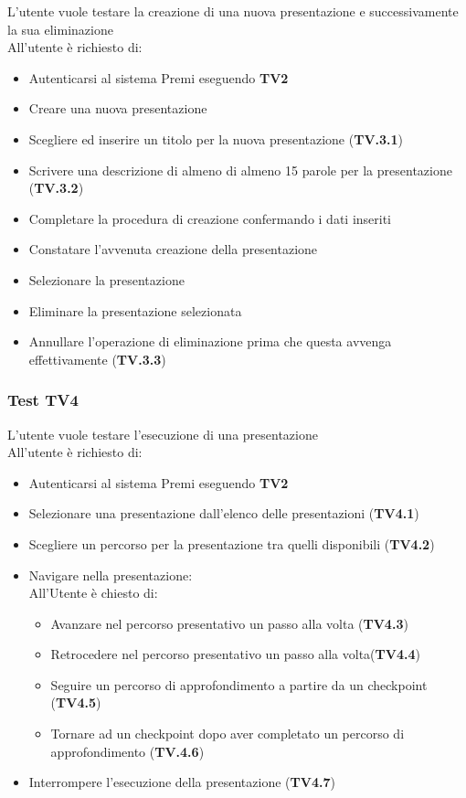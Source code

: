 L'utente vuole testare la creazione di una nuova presentazione e successivamente la sua eliminazione\\
All'utente è richiesto di:
\begin{itemize}
	\item Autenticarsi al sistema Premi eseguendo \textbf{TV2}
	\item Creare una nuova presentazione 
	\item Scegliere ed inserire un titolo per la nuova presentazione (\textbf{TV.3.1}) 
	\item Scrivere una descrizione di almeno di almeno 15 parole per la presentazione (\textbf{TV.3.2})  
	\item Completare la procedura di creazione confermando i dati inseriti
	\item Constatare l'avvenuta creazione della presentazione
	\item Selezionare la presentazione
	\item Eliminare la presentazione selezionata 
	\item Annullare l'operazione di eliminazione prima che questa avvenga effettivamente (\textbf{TV.3.3})
\end{itemize}

\subsubsection {Test TV4} %

L'utente vuole testare l'esecuzione di una presentazione\\
All'utente è richiesto di:

\begin{itemize}
	\item Autenticarsi al sistema Premi eseguendo \textbf{TV2}
	\item Selezionare una presentazione dall'elenco delle presentazioni (\textbf{TV4.1}) 
	\item Scegliere un percorso per la presentazione tra quelli disponibili (\textbf{TV4.2})
	\item Navigare nella presentazione:\\
	All'Utente è chiesto di:
	\begin{itemize}
		\item Avanzare nel percorso presentativo un passo alla volta (\textbf{TV4.3})
		\item Retrocedere nel percorso presentativo un passo alla volta(\textbf{TV4.4}) 
		\item Seguire un percorso di approfondimento a partire da un checkpoint (\textbf{TV4.5})
		\item Tornare ad un checkpoint dopo aver completato un percorso di approfondimento (\textbf{TV.4.6})
		\end{itemize}
	\item Interrompere l'esecuzione della presentazione (\textbf{TV4.7})
\end{itemize}

